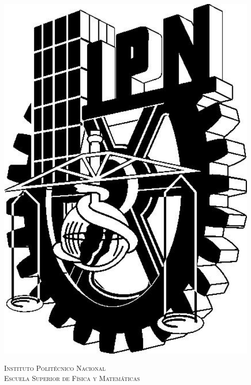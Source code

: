 

{}
\thispagestyle{empty}
\begin{center}
    \begin{minipage}{0.1\textwidth}
        \centering
        \includegraphics[width=0.95\textwidth]{img/ipn.jpg}
    \end{minipage}
    \hspace{10pt}
    \begin{minipage}{0.7\textwidth}
        \centering
        {\Large\textsc{Instituto Politécnico Nacional}} \\
        {\large\textsc{Escuela Superior de Física y Matemáticas}}
        \medskip
    \end{minipage}
    \hspace{10pt}
    \begin{minipage}{0.1\textwidth}

\end{minipage}
\end{center}
